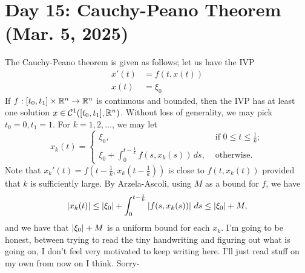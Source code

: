 \section{Day 15: Cauchy-Peano Theorem (Mar. 5, 2025)}
The Cauchy-Peano theorem is given as follows; let us have the IVP
\begin{align*}
    x'(t) &= f(t, x(t)) \tag{$t \in [t_0, t_1], x(t) \in \RR^n$} \\
    x(t) &= \xi_0
\end{align*}
If $f : [t_0, t_1] \times \mathbb R^n \to \mathbb R^n$ is continuous and bounded, then the  IVP has at least one solution $x \in \mathcal C^1([t_0, t_1], \mathbb R^n)$.
\medskip\newline
Without loss of generality, we may pick $t_0 = 0, t_1 = 1$. For  $k = 1, 2, \dots$, we may let
\[ x_k(t) = \begin{cases} \xi_0, & \text{ if } 0 \leq t \leq \frac{1}{k}; \\ \xi_0 + \int_0^{t - \frac{1}{k}} f(s, x_k(s)) \, ds, & \text{ otherwise.} \end{cases} \]
Note that $x_k'(t) = f(t - \frac{1}{k}, x_k(t - \frac{1}{k}))$ is close to $f(t, x_k(t))$ provided that $k$ is sufficiently large. By Arzela-Ascoli, using $M$ as a bound for $f$, we have
\[ \left\lvert x_k(t) \right\rvert \leq \left\lvert \xi_0 \right\rvert + \int_0^{t - \frac{1}{k}} \left\lvert f(s, x_k(s)) \right\rvert \, ds \leq \left\lvert \xi_0 \right\rvert + M, \]
and we have that $\left\lvert \xi_0 \right\rvert + M$ is a uniform bound for each $x_k$.
\medskip\newline
I'm going to be honest, between trying to read the tiny handwriting and figuring out what is going on, I don't feel very motivated to keep writing here. I'll just read stuff on my own from now on I think. Sorry-